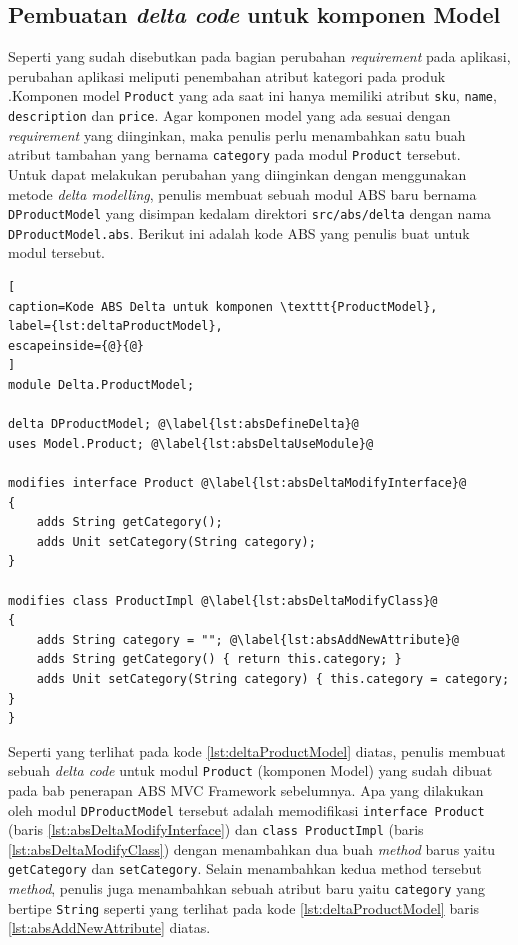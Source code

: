 \subsection{Pembuatan \textit{delta code} untuk komponen Model}

Seperti yang sudah disebutkan pada bagian perubahan \textit{requirement} pada aplikasi, perubahan aplikasi meliputi penembahan atribut kategori pada produk .Komponen model \texttt{Product} yang ada saat ini hanya memiliki atribut \texttt{sku}, \texttt{name}, \texttt{description} dan \texttt{price}. Agar komponen model yang ada sesuai dengan \textit{requirement} yang diinginkan, maka penulis perlu menambahkan satu buah atribut tambahan yang bernama \texttt{category} pada modul \texttt{Product} tersebut.\\

Untuk dapat melakukan perubahan yang diinginkan dengan menggunakan metode \textit{delta modelling}, penulis membuat sebuah modul ABS baru bernama \texttt{DProductModel} yang disimpan kedalam direktori \texttt{src/abs/delta} dengan nama \texttt{DProductModel.abs}. Berikut ini adalah kode ABS yang penulis buat untuk modul tersebut.

\begin{lstlisting}[
caption=Kode ABS Delta untuk komponen \texttt{ProductModel},
label={lst:deltaProductModel},
escapeinside={@}{@}
]
module Delta.ProductModel;

delta DProductModel; @\label{lst:absDefineDelta}@
uses Model.Product; @\label{lst:absDeltaUseModule}@

modifies interface Product @\label{lst:absDeltaModifyInterface}@
{
	adds String getCategory();
	adds Unit setCategory(String category);
}

modifies class ProductImpl @\label{lst:absDeltaModifyClass}@
{
	adds String category = ""; @\label{lst:absAddNewAttribute}@
	adds String getCategory() { return this.category; }
	adds Unit setCategory(String category) { this.category = category; }
}
\end{lstlisting}

Seperti yang terlihat pada kode \ref{lst:deltaProductModel} diatas, penulis membuat sebuah \textit{delta code} untuk modul \texttt{Product} (komponen Model) yang sudah dibuat pada bab penerapan ABS MVC Framework sebelumnya. Apa yang dilakukan oleh modul \texttt{DProductModel} tersebut adalah memodifikasi \texttt{interface Product} (baris \ref{lst:absDeltaModifyInterface}) dan \texttt{class ProductImpl} (baris \ref{lst:absDeltaModifyClass}) dengan menambahkan dua buah \textit{method} barus yaitu \texttt{getCategory} dan \texttt{setCategory}. Selain menambahkan kedua method tersebut \textit{method}, penulis juga menambahkan sebuah atribut baru yaitu \texttt{category} yang bertipe \texttt{String} seperti yang terlihat pada kode \ref{lst:deltaProductModel} baris \ref{lst:absAddNewAttribute} diatas.\\

